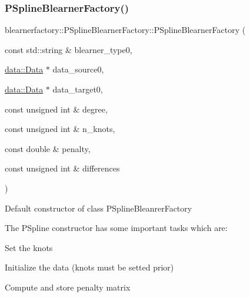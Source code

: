 \subsubsection{\texorpdfstring{P\+Spline\+Blearner\+Factory()}{PSplineBlearnerFactory()}}
{\footnotesize\ttfamily blearnerfactory\+::\+P\+Spline\+Blearner\+Factory\+::\+P\+Spline\+Blearner\+Factory (\begin{DoxyParamCaption}\item[{const std\+::string \&}]{blearner\+\_\+type0,  }\item[{\hyperlink{classdata_1_1_data}{data\+::\+Data} $\ast$}]{data\+\_\+source0,  }\item[{\hyperlink{classdata_1_1_data}{data\+::\+Data} $\ast$}]{data\+\_\+target0,  }\item[{const unsigned int \&}]{degree,  }\item[{const unsigned int \&}]{n\+\_\+knots,  }\item[{const double \&}]{penalty,  }\item[{const unsigned int \&}]{differences }\end{DoxyParamCaption})}



Default constructor of class {\ttfamily P\+Spline\+Bleanrer\+Factory} 

The P\+Spline constructor has some important tasks which are\+:
\begin{DoxyItemize}
\item Set the knots
\item Initialize the data (knots must be setted prior)
\item Compute and store penalty matrix
\end{DoxyItemize}


